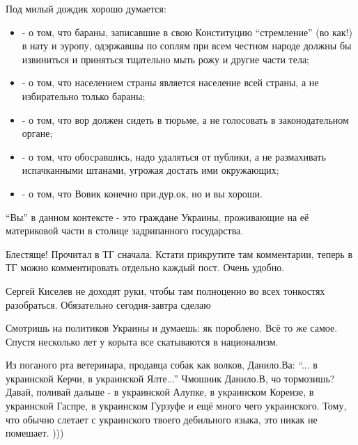 \begin{itemize}

Под милый дождик хорошо думается:

\begin{itemize}
  \item - о том, что бараны, записавшие в свою Конституцию \enquote{стремление} (во как!) в нату и эуропу, одэржавшы по соплям при всем честном народе должны бы извиниться и приняться тщательно мыть рожу и другие части тела;
  \item - о том, что населением страны является население всей страны, а не избирательно только бараны;
  \item - о том, что вор должен сидеть в тюрьме, а не голосовать в законодательном органе;
  \item - о том, что обосравшись, надо удаляться от публики, а не размахивать испачканными штанами, угрожая достать ими окружающих;
  \item - о том, что Вовик конечно при.дур.ок, но и вы хороши.
\end{itemize}

\enquote{Вы} в данном контексте - это граждане Украины, проживающие на её материковой части в столице задрипанного государства.


Блестяще! Прочитал в ТГ сначала. Кстати прикрутите там комментарии, теперь в
ТГ можно комментировать отдельно каждый пост. Очень удобно.


Сергей Киселев не доходят руки, чтобы там полноценно во всех тонкостях разобраться. Обязательно сегодня-завтра сделаю

Смотришь на политиков Украины и думаешь: як пороблено. Всё то же самое. Спустя несколько лет у корыта все скатываются в национализм.


Из поганого рта ветеринара, продавца собак как волков, Данило.Ва: \enquote{... в
украинской Керчи, в украинской Ялте...} Чмошник Данило.В, чо тормозишь? Давай,
поливай дальше - в украинской Алупке, в украинском Кореизе, в украинской
Гаспре, в украинском Гурзуфе и ещё много чего украинского. Тому, что обычно
слетает с украинского твоего дебильного языка, это никак не помешает. )))



\end{itemize}
